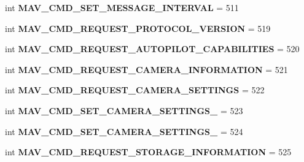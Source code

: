 \begin{DoxyCompactItemize}
\mbox{\label{namespacepymavlink_1_1dialects_1_1v10_adcf794de4bed252775fd5bc61a112c41}} 
int {\bfseries M\+A\+V\+\_\+\+C\+M\+D\+\_\+\+S\+E\+T\+\_\+\+M\+E\+S\+S\+A\+G\+E\+\_\+\+I\+N\+T\+E\+R\+V\+AL} = 511
\item 
\mbox{\label{namespacepymavlink_1_1dialects_1_1v10_a6495b680a99d3591a8c4eb881bcea626}} 
int {\bfseries M\+A\+V\+\_\+\+C\+M\+D\+\_\+\+R\+E\+Q\+U\+E\+S\+T\+\_\+\+P\+R\+O\+T\+O\+C\+O\+L\+\_\+\+V\+E\+R\+S\+I\+ON} = 519
\item 
\mbox{\label{namespacepymavlink_1_1dialects_1_1v10_a349de075edd25a27043e0ec4fe45eacc}} 
int {\bfseries M\+A\+V\+\_\+\+C\+M\+D\+\_\+\+R\+E\+Q\+U\+E\+S\+T\+\_\+\+A\+U\+T\+O\+P\+I\+L\+O\+T\+\_\+\+C\+A\+P\+A\+B\+I\+L\+I\+T\+I\+ES} = 520
\item 
\mbox{\label{namespacepymavlink_1_1dialects_1_1v10_a229c1d0911fcfef174ca8bba9a6fda78}} 
int {\bfseries M\+A\+V\+\_\+\+C\+M\+D\+\_\+\+R\+E\+Q\+U\+E\+S\+T\+\_\+\+C\+A\+M\+E\+R\+A\+\_\+\+I\+N\+F\+O\+R\+M\+A\+T\+I\+ON} = 521
\item 
\mbox{\label{namespacepymavlink_1_1dialects_1_1v10_a8fad078ba7ddc7420e2a0b2af689f9d6}} 
int {\bfseries M\+A\+V\+\_\+\+C\+M\+D\+\_\+\+R\+E\+Q\+U\+E\+S\+T\+\_\+\+C\+A\+M\+E\+R\+A\+\_\+\+S\+E\+T\+T\+I\+N\+GS} = 522
\item 
\mbox{\label{namespacepymavlink_1_1dialects_1_1v10_a7816ed6dba90503a5e5a2fdf13ba5593}} 
int {\bfseries M\+A\+V\+\_\+\+C\+M\+D\+\_\+\+S\+E\+T\+\_\+\+C\+A\+M\+E\+R\+A\+\_\+\+S\+E\+T\+T\+I\+N\+G\+S\+\_} = 523
\item 
\mbox{\label{namespacepymavlink_1_1dialects_1_1v10_a4526f3616519c29aa6b2ca53635676bf}} 
int {\bfseries M\+A\+V\+\_\+\+C\+M\+D\+\_\+\+S\+E\+T\+\_\+\+C\+A\+M\+E\+R\+A\+\_\+\+S\+E\+T\+T\+I\+N\+G\+S\+\_} = 524
\item 
\mbox{\label{namespacepymavlink_1_1dialects_1_1v10_a368ebfba1f897327787ea29b374657c9}} 
int {\bfseries M\+A\+V\+\_\+\+C\+M\+D\+\_\+\+R\+E\+Q\+U\+E\+S\+T\+\_\+\+S\+T\+O\+R\+A\+G\+E\+\_\+\+I\+N\+F\+O\+R\+M\+A\+T\+I\+ON} = 525

\end{DoxyCompactItemize}
